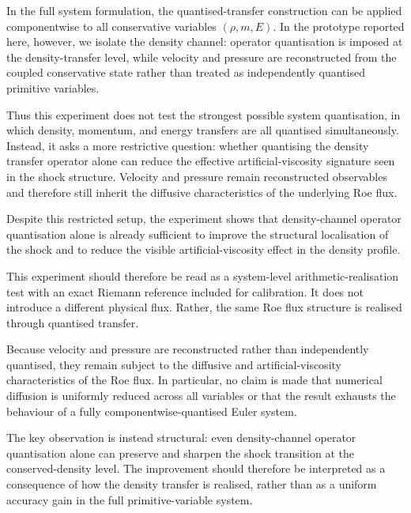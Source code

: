 \documentclass[sn-basic]{sn-jnl}
\theoremstyle{plain}
\theoremstyle{remark}
\begin{document}
In the full system formulation, the quantised-transfer construction can be applied componentwise to all conservative variables \((\rho,m,E)\). In the prototype reported here, however, we isolate the density channel: operator quantisation is imposed at the density-transfer level, while velocity and pressure are reconstructed from the coupled conservative state rather than treated as independently quantised primitive variables.

Thus this experiment does not test the strongest possible system quantisation, in which density, momentum, and energy transfers are all quantised simultaneously. Instead, it asks a more restrictive question: whether quantising the density transfer operator alone can reduce the effective artificial-viscosity signature seen in the shock structure. Velocity and pressure remain reconstructed observables and therefore still inherit the diffusive characteristics of the underlying Roe flux.

Despite this restricted setup, the experiment shows that density-channel operator quantisation alone is already sufficient to improve the structural localisation of the shock and to reduce the visible artificial-viscosity effect in the density profile.

This experiment should therefore be read as a system-level arithmetic-realisation test with an exact Riemann reference included for calibration. It does not introduce a different physical flux. Rather, the same Roe flux structure is realised through quantised transfer.

Because velocity and pressure are reconstructed rather than independently quantised, they remain subject to the diffusive and artificial-viscosity characteristics of the Roe flux. In particular, no claim is made that numerical diffusion is uniformly reduced across all variables or that the result exhausts the behaviour of a fully componentwise-quantised Euler system.

The key observation is instead structural: even density-channel operator quantisation alone can preserve and sharpen the shock transition at the conserved-density level. The improvement should therefore be interpreted as a consequence of how the density transfer is realised, rather than as a uniform accuracy gain in the full primitive-variable system.
\end{document}
